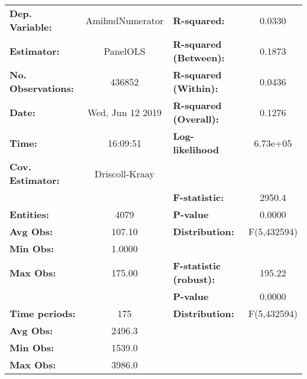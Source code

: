 \begin{center}
\begin{tabular}{lclc}
\toprule
\textbf{Dep. Variable:}                 &  AmihudNumerator   & \textbf{  R-squared:         }   &      0.0330      \\
\textbf{Estimator:}                     &      PanelOLS      & \textbf{  R-squared (Between):}  &      0.1873      \\
\textbf{No. Observations:}              &       436852       & \textbf{  R-squared (Within):}   &      0.0436      \\
\textbf{Date:}                          &  Wed, Jun 12 2019  & \textbf{  R-squared (Overall):}  &      0.1276      \\
\textbf{Time:}                          &      16:09:51      & \textbf{  Log-likelihood     }   &     6.73e+05     \\
\textbf{Cov. Estimator:}                &   Driscoll-Kraay   & \textbf{                     }   &                  \\
\textbf{}                               &                    & \textbf{  F-statistic:       }   &      2950.4      \\
\textbf{Entities:}                      &        4079        & \textbf{  P-value            }   &      0.0000      \\
\textbf{Avg Obs:}                       &       107.10       & \textbf{  Distribution:      }   &   F(5,432594)    \\
\textbf{Min Obs:}                       &       1.0000       & \textbf{                     }   &                  \\
\textbf{Max Obs:}                       &       175.00       & \textbf{  F-statistic (robust):} &      195.22      \\
\textbf{}                               &                    & \textbf{  P-value            }   &      0.0000      \\
\textbf{Time periods:}                  &        175         & \textbf{  Distribution:      }   &   F(5,432594)    \\
\textbf{Avg Obs:}                       &       2496.3       & \textbf{                     }   &                  \\
\textbf{Min Obs:}                       &       1539.0       & \textbf{                     }   &                  \\
\textbf{Max Obs:}                       &       3986.0       & \textbf{                     }   &                  \\

\end{tabular}
\end{center}
